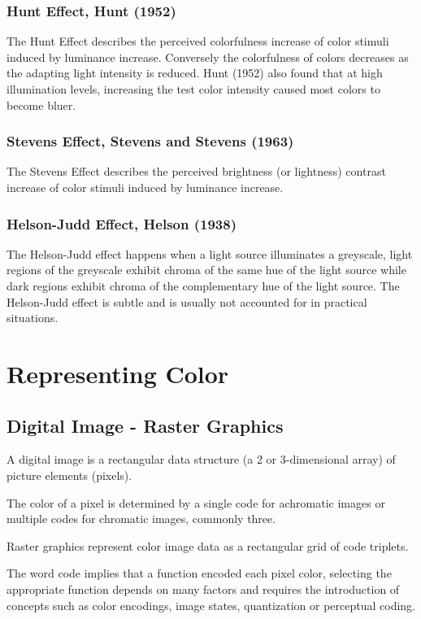 \subsubsection{Hunt Effect, Hunt (1952)}

The Hunt Effect describes the perceived colorfulness increase of color stimuli induced by luminance increase. Conversely the colorfulness of colors decreases as the adapting light intensity is reduced. 
Hunt (1952) also found that at high illumination levels, increasing the test color intensity caused most colors to become bluer.

\subsubsection{Stevens Effect, Stevens and Stevens (1963)}

The Stevens Effect describes the perceived brightness (or lightness) contrast increase of color stimuli induced by luminance increase.

\subsubsection{Helson-Judd Effect, Helson (1938)}

The Helson-Judd effect happens when a light source illuminates a greyscale, light regions of the greyscale exhibit chroma of the same hue of the light source while dark regions exhibit chroma of the complementary hue of the light source. The Helson-Judd effect is subtle and is usually not accounted for in practical situations.

\section{Representing Color}

\subsection{Digital Image - Raster Graphics}

A digital image is a rectangular data structure (a 2 or 3-dimensional array) of picture elements (pixels). 

The color of a pixel is determined by a single code for achromatic images or multiple codes for chromatic images, commonly three.

Raster graphics represent color image data as a rectangular grid of code triplets.

The word code implies that a function encoded each pixel color, selecting the appropriate function depends on many factors and requires the introduction of concepts such as color encodings, image states, quantization or perceptual coding.

